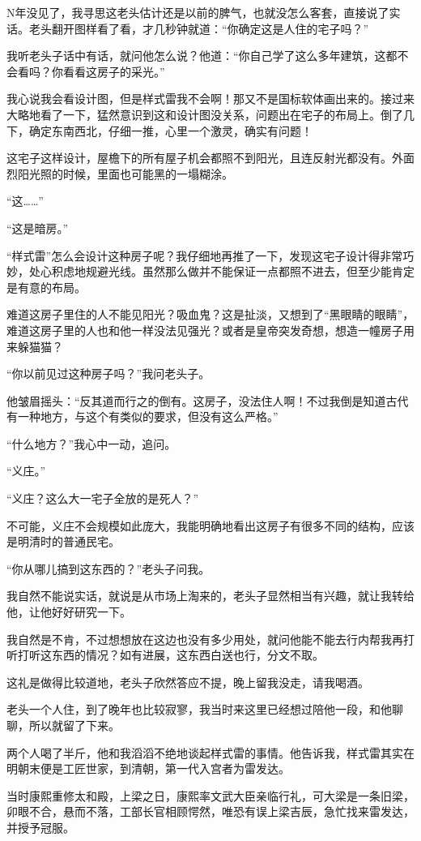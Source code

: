 N年没见了，我寻思这老头估计还是以前的脾气，也就没怎么客套，直接说了实话。老头翻开图样看了看，才几秒钟就道：“你确定这是人住的宅子吗？”

我听老头子话中有话，就问他怎么说？他道：“你自己学了这么多年建筑，这都不会看吗？你看看这房子的采光。”

我心说我会看设计图，但是样式雷我不会啊！那又不是国标软体画出来的。接过来大略地看了一下，猛然意识到这和设计图没关系，问题出在宅子的布局上。倒了几下，确定东南西北，仔细一推，心里一个激灵，确实有问题！

这宅子这样设计，屋檐下的所有屋子机会都照不到阳光，且连反射光都没有。外面烈阳光照的时候，里面也可能黑的一塌糊涂。

“这……”

“这是暗房。”

“样式雷”怎么会设计这种房子呢？我仔细地再推了一下，发现这宅子设计得非常巧妙，处心积虑地规避光线。虽然那么做并不能保证一点都照不进去，但至少能肯定是有意的布局。

难道这房子里住的人不能见阳光？吸血鬼？这是扯淡，又想到了“黑眼睛的眼睛”，难道这房子里的人也和他一样没法见强光？或者是皇帝突发奇想，想造一幢房子用来躲猫猫？

“你以前见过这种房子吗？”我问老头子。

他皱眉摇头：“反其道而行之的倒有。这房子，没法住人啊！不过我倒是知道古代有一种地方，与这个有类似的要求，但没有这么严格。”

“什么地方？”我心中一动，追问。

“义庄。”

“义庄？这么大一宅子全放的是死人？”

不可能，义庄不会规模如此庞大，我能明确地看出这房子有很多不同的结构，应该是明清时的普通民宅。

“你从哪儿搞到这东西的？”老头子问我。

我自然不能说实话，就说是从市场上淘来的，老头子显然相当有兴趣，就让我转给他，让他好好研究一下。

我自然是不肯，不过想想放在这边也没有多少用处，就问他能不能去行内帮我再打听打听这东西的情况？如有进展，这东西白送也行，分文不取。

这礼是做得比较道地，老头子欣然答应不提，晚上留我没走，请我喝酒。

老头一个人住，到了晚年也比较寂寥，我当时来这里已经想过陪他一段，和他聊聊，所以就留了下来。

两个人喝了半斤，他和我滔滔不绝地谈起样式雷的事情。他告诉我，样式雷其实在明朝末便是工匠世家，到清朝，第一代入宫者为雷发达。

当时康熙重修太和殿，上梁之日，康熙率文武大臣亲临行礼，可大梁是一条旧梁，卯眼不合，悬而不落，工部长官相顾愕然，唯恐有误上梁吉辰，急忙找来雷发达，并授予冠服。

